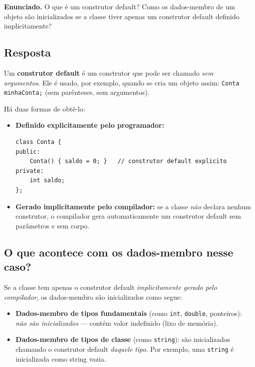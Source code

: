 \documentclass[11pt,a4paper]{article}
\begin{document}
\begin{enunciado}
\textbf{Enunciado.} O que \'e um construtor default? Como os dados-membro de um objeto s\~ao inicializados se a classe tiver apenas um construtor default definido implicitamente?
\end{enunciado}

\subsection*{Resposta}

Um \textbf{construtor default} \'e um construtor que pode ser chamado \emph{sem argumentos}. Ele \'e usado, por exemplo, quando se cria um objeto assim: \texttt{Conta minhaConta;} (sem par\^enteses, sem argumentos).

H\'a duas formas de obt\^e-lo:

\begin{itemize}[leftmargin=*,itemsep=0pt]
  \item \textbf{Definido explicitamente pelo programador:}
    \begin{lstlisting}[style=cppcode,numbers=none]
class Conta {
public:
    Conta() { saldo = 0; }   // construtor default explicito
private:
    int saldo;
};
    \end{lstlisting}
  \item \textbf{Gerado implicitamente pelo compilador:} se a classe \emph{n\~ao} declara nenhum construtor, o compilador gera automaticamente um construtor default sem par\^ametros e sem corpo.
\end{itemize}

\subsection*{O que acontece com os dados-membro nesse caso?}

Se a classe tem apenas o construtor default \emph{implicitamente gerado pelo compilador}, os dados-membro s\~ao inicializados como segue:

\begin{itemize}[leftmargin=*,itemsep=0pt]
  \item \textbf{Dados-membro de tipos fundamentais} (como \texttt{int}, \texttt{double}, ponteiros): \emph{n\~ao s\~ao inicializados} --- cont\'em valor indefinido (lixo de mem\'oria).
  \item \textbf{Dados-membro de tipos de classe} (como \texttt{string}): s\~ao inicializados chamando o construtor default \emph{daquele tipo}. Por exemplo, uma \texttt{string} \'e inicializada como string vazia.
\end{itemize}
\end{document}
